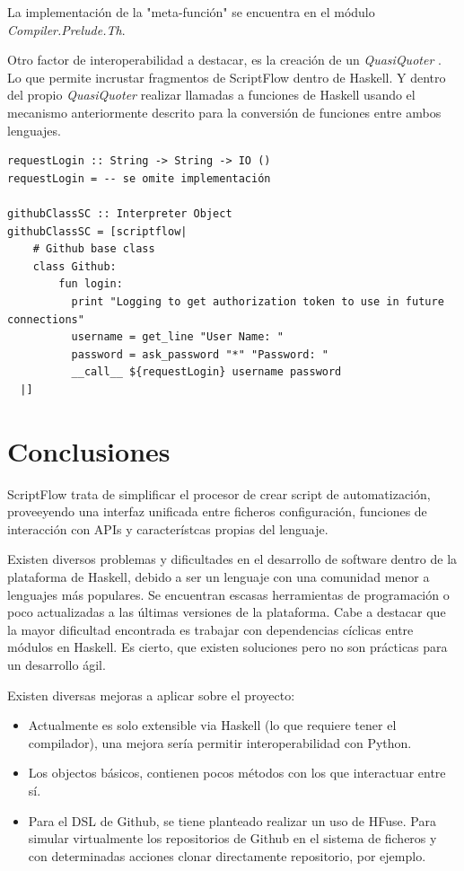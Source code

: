 \documentclass[11pt]{article}
\begin{document}
La implementación de la "meta-función" se encuentra en el módulo \emph{Compiler.Prelude.Th}.

Otro factor de interoperabilidad a destacar, es la creación de un \emph{QuasiQuoter} \cite{quasi-quoter}. Lo que permite incrustar fragmentos de ScriptFlow
dentro de Haskell. Y dentro del propio \emph{QuasiQuoter} realizar llamadas a funciones de Haskell usando el mecanismo anteriormente descrito
para la conversión de funciones entre ambos lenguajes.

\begin{verbatim}
requestLogin :: String -> String -> IO ()
requestLogin = -- se omite implementación

githubClassSC :: Interpreter Object
githubClassSC = [scriptflow|
    # Github base class
    class Github:
        fun login:
          print "Logging to get authorization token to use in future connections"
          username = get_line "User Name: "
          password = ask_password "*" "Password: "
          __call__ ${requestLogin} username password
  |]
\end{verbatim}

\section{Conclusiones}
\label{sec:orgcc62823}

ScriptFlow trata de simplificar el procesor de crear script de automatización, proveeyendo una interfaz unificada entre ficheros
configuración, funciones de interacción con APIs y característcas propias del lenguaje.

Existen diversos problemas y dificultades en el desarrollo de software dentro de la plataforma de Haskell, debido a ser un lenguaje
con una comunidad menor a lenguajes más populares. Se encuentran escasas herramientas de programación o poco actualizadas a las últimas versiones de la plataforma.
Cabe a destacar que la mayor dificultad encontrada es trabajar con dependencias cíclicas entre módulos en Haskell. Es cierto, que existen soluciones pero
no son prácticas para un desarrollo ágil.

Existen diversas mejoras a aplicar sobre el proyecto:
\begin{itemize}
\item Actualmente es solo extensible via Haskell (lo que requiere tener el compilador), una mejora sería permitir interoperabilidad con Python.
\item Los objectos básicos, contienen pocos métodos con los que interactuar entre sí.
\item Para el DSL de Github, se tiene planteado realizar un uso de HFuse. Para simular virtualmente los repositorios de Github en el sistema de ficheros
y con determinadas acciones clonar directamente repositorio, por ejemplo.
\end{itemize}


\renewcommand{\refname}{Bibliografía}

\newpage



\end{document}

